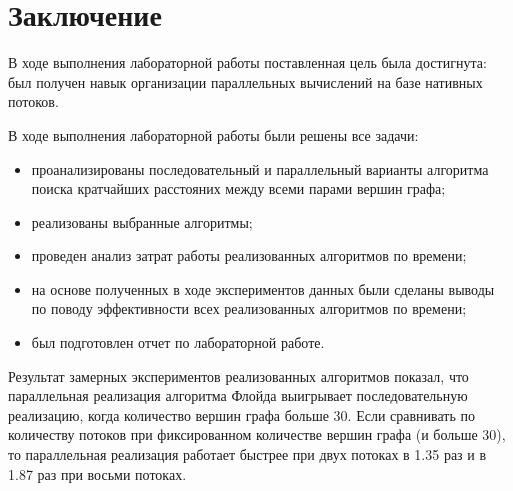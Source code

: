 \chapter*{Заключение}

В ходе выполнения лабораторной работы поставленная цель была достигнута: был получен навык организации параллельных вычислений на базе нативных потоков.

В ходе выполнения лабораторной работы были решены все задачи:
\begin{itemize}[label*=---]
	\item проанализированы последовательный и параллельный варианты алгоритма поиска кратчайших расстояних между всеми парами вершин графа;
	\item реализованы выбранные алгоритмы;
	\item проведен анализ затрат работы реализованных алгоритмов по времени;
	\item на основе полученных в ходе экспериментов данных были сделаны выводы по поводу эффективности всех реализованных алгоритмов по времени;
	\item был подготовлен отчет по лабораторной работе.
\end{itemize}

Результат замерных экспериментов реализованных алгоритмов показал, что параллельная реализация алгоритма Флойда выигрывает последовательную реализацию, когда количество вершин графа больше 30. Если сравнивать по количеству потоков при фиксированном количестве вершин графа (и больше 30), то параллельная реализация работает быстрее при двух потоках в 1.35 раз и в 1.87 раз при восьми потоках.